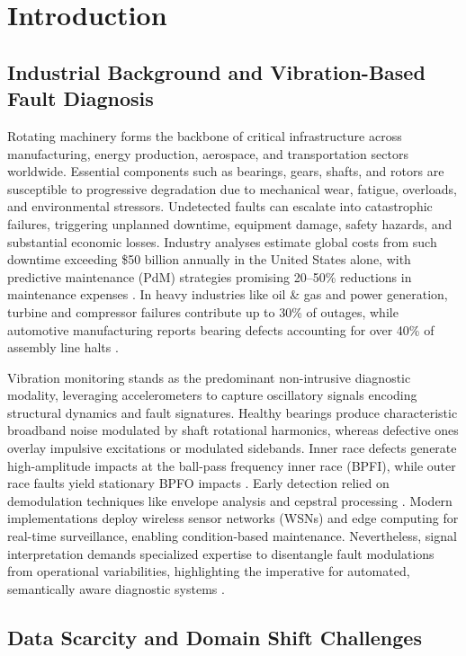 \section{Introduction}

\subsection{Industrial Background and Vibration-Based Fault Diagnosis}

Rotating machinery forms the backbone of critical infrastructure across manufacturing, energy production, aerospace, and transportation sectors worldwide. Essential components such as bearings, gears, shafts, and rotors are susceptible to progressive degradation due to mechanical wear, fatigue, overloads, and environmental stressors. Undetected faults can escalate into catastrophic failures, triggering unplanned downtime, equipment damage, safety hazards, and substantial economic losses. Industry analyses estimate global costs from such downtime exceeding \$50 billion annually in the United States alone, with predictive maintenance (PdM) strategies promising 20--50\% reductions in maintenance expenses \cite{cite1}\cite{cite22}. In heavy industries like oil \& gas and power generation, turbine and compressor failures contribute up to 30\% of outages, while automotive manufacturing reports bearing defects accounting for over 40\% of assembly line halts \cite{cite23}.

Vibration monitoring stands as the predominant non-intrusive diagnostic modality, leveraging accelerometers to capture oscillatory signals encoding structural dynamics and fault signatures. Healthy bearings produce characteristic broadband noise modulated by shaft rotational harmonics, whereas defective ones overlay impulsive excitations or modulated sidebands. Inner race defects generate high-amplitude impacts at the ball-pass frequency inner race (BPFI), while outer race faults yield stationary BPFO impacts \cite{cite2}. Early detection relied on demodulation techniques like envelope analysis and cepstral processing \cite{cite3}. Modern implementations deploy wireless sensor networks (WSNs) and edge computing for real-time surveillance, enabling condition-based maintenance. Nevertheless, signal interpretation demands specialized expertise to disentangle fault modulations from operational variabilities, highlighting the imperative for automated, semantically aware diagnostic systems \cite{cite4}\cite{cite24}.

\subsection{Data Scarcity and Domain Shift Challenges}

